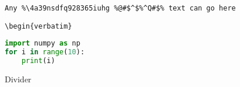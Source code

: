 \documentclass[12pt]{report}
\begin{document}
\lstlistoflistings

\begin{verbatim}
Any %\4a39nsdfq928365iuhg %@#$^$%^Q#$% text can go here
\end{verbatim}

\verb|\begin{verbatim}| %

\begin{lstlisting}[language=Python, caption=hello this is a test caption] 
import numpy as np 
for i in range(10):
    print(i)
\end{lstlisting}

Divider 


\end{document}
